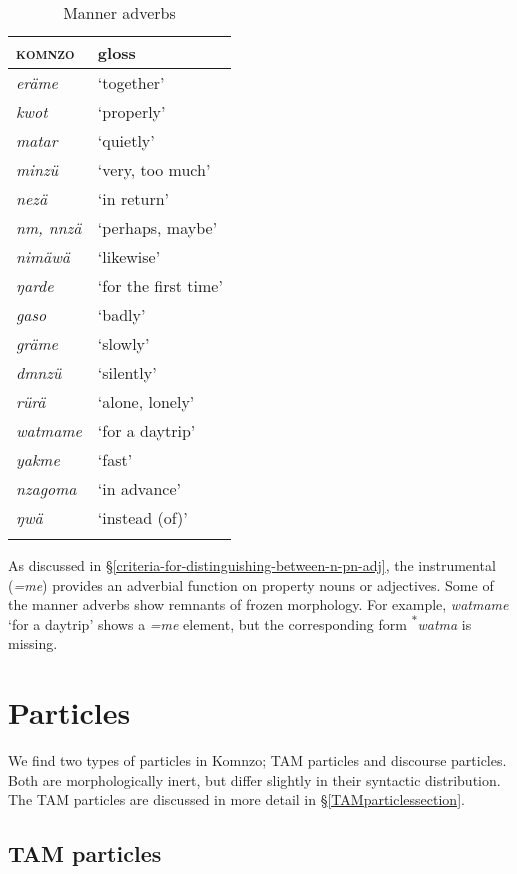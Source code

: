 \begin{table}
\caption{Manner adverbs}
\label{manner-adverbs}
	\begin{tabular}{ll}
		\lsptoprule
		\textsc{komnzo}&{gloss}\\\midrule
		\emph{eräme}&`together'\\
		\emph{kwot}&`properly'\\
		\emph{matar}&`quietly'\\
		\emph{minzü}&`very, too much'\\
		\emph{nezä}&`in return'\\
		\emph{nm, nnzä}&`perhaps, maybe'\\
		\emph{nimäwä}&`likewise'\\
		\emph{ŋarde}&`for the first time'\\
		\emph{gaso}&`badly'\\
		\emph{gräme}&`slowly'\\
		\emph{dmnzü}&`silently'\\
		\emph{rürä}&`alone, lonely'\\
		\emph{watmame}&`for a daytrip'\\
		\emph{yakme}&`fast'\\
		\emph{nzagoma}&`in advance'\\
		\emph{ŋwä}&`instead (of)'\\
		\lspbottomrule
	\end{tabular}
\end{table}%

As discussed in \S{}\ref{criteria-for-distinguishing-between-n-pn-adj}, the instrumental  (\emph{=me}) provides an adverbial function on property nouns or adjectives. Some of the manner adverbs show remnants of frozen morphology. For example, \emph{watmame} `for a daytrip' shows a \emph{=me} element, but the corresponding form \textsuperscript{$\ast$}\emph{watma} is missing.

\section{Particles} \label{particles}

We find two types of particles in Komnzo; TAM particles and discourse particles. Both are morphologically inert, but differ slightly in their syntactic distribution. The TAM particles are discussed in more detail in \S{}\ref{TAMparticlessection}.

\subsection{TAM particles} \label{tamparticles}

